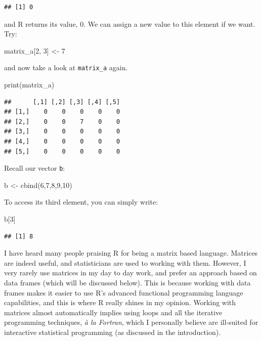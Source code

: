 \documentclass[
]{article}
\newenvironment{Shaded}{\begin{snugshade}}{\end{snugshade}}
\newcommand{\DecValTok}[1]{\textcolor[rgb]{0.00,0.00,0.81}{#1}}
\newcommand{\FunctionTok}[1]{\textcolor[rgb]{0.00,0.00,0.00}{#1}}
\newcommand{\NormalTok}[1]{#1}
\newcommand{\OtherTok}[1]{\textcolor[rgb]{0.56,0.35,0.01}{#1}}
\begin{document}
\begin{verbatim}
## [1] 0
\end{verbatim}

and R returns its value, 0. We can assign a new value to this element if we want. Try:

\begin{Shaded}
\begin{Highlighting}[]
\NormalTok{matrix\_a[}\DecValTok{2}\NormalTok{, }\DecValTok{3}\NormalTok{] }\OtherTok{\textless{}{-}} \DecValTok{7}
\end{Highlighting}
\end{Shaded}

and now take a look at \texttt{matrix\_a} again.

\begin{Shaded}
\begin{Highlighting}[]
\FunctionTok{print}\NormalTok{(matrix\_a)}
\end{Highlighting}
\end{Shaded}

\begin{verbatim}
##      [,1] [,2] [,3] [,4] [,5]
## [1,]    0    0    0    0    0
## [2,]    0    0    7    0    0
## [3,]    0    0    0    0    0
## [4,]    0    0    0    0    0
## [5,]    0    0    0    0    0
\end{verbatim}

Recall our vector \texttt{b}:

\begin{Shaded}
\begin{Highlighting}[]
\NormalTok{b }\OtherTok{\textless{}{-}} \FunctionTok{cbind}\NormalTok{(}\DecValTok{6}\NormalTok{,}\DecValTok{7}\NormalTok{,}\DecValTok{8}\NormalTok{,}\DecValTok{9}\NormalTok{,}\DecValTok{10}\NormalTok{)}
\end{Highlighting}
\end{Shaded}

To access its third element, you can simply write:

\begin{Shaded}
\begin{Highlighting}[]
\NormalTok{b[}\DecValTok{3}\NormalTok{]}
\end{Highlighting}
\end{Shaded}

\begin{verbatim}
## [1] 8
\end{verbatim}

I have heard many people praising R for being a matrix based language. Matrices are indeed useful,
and statisticians are used to working with them. However, I very rarely use matrices in my
day to day work, and prefer an approach based on data frames (which will be discussed below). This
is because working with data frames makes it easier to use R's advanced functional programming
language capabilities, and this is where R really shines in my opinion. Working with matrices
almost automatically implies using loops and all the iterative programming techniques, \emph{à la Fortran},
which I personally believe are ill-suited for interactive statistical programming (as discussed in
the introduction).
\end{document}
